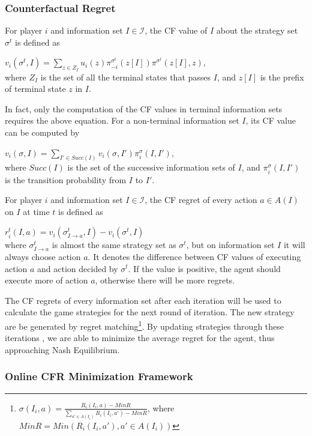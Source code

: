 \documentclass{article}
\begin{document}
\subsubsection{Counterfactual Regret}

For player $i$ and information set $I \in \mathscr{I}$, the CF value of $I$ about the strategy set $\sigma^t$ is defined as

$v_i(\sigma^t, I) = \sum_{z \in Z_I} u_i(z) \pi_{-i}^{\sigma^t}(z[I]) \pi^{\sigma^t}(z[I], z)$,\\
where $Z_I$ is the set of all the terminal states that passes $I$, and $z[I]$ is the prefix of terminal state $z$ in $I$.

In fact, only the computation of the CF values in terminal information sets requires the above equation. For a non-terminal information set $I$, its CF value can be computed by

$v_i(\sigma, I) = \sum_{I' \in Succ(I)} v_i(\sigma, I') \pi_i^\sigma(I, I')$,
\\where $Succ(I)$ is the set of the successive information sets of $I$, and $\pi_i^\sigma(I, I')$ is the transition probability from $I$ to $I'$.

For player $i$ and information set $I \in \mathscr{I}$, the CF regret of every action $a \in A(I)$ on $I$ at time $t$ is defined as

$r_i^t(I, a) = v_i(\sigma_{I \rightarrow a}^t, I) - v_i(\sigma^t, I)$\\
where $\sigma_{I \rightarrow a}^t$ is almost the same strategy set as $\sigma^t$, but on information set $I$ it will always choose action $a$. It denotes the difference between CF values of executing action $a$ and action decided by $\sigma^t$. If the value is positive, the agent should execute more of action $a$, otherwise there will be more regrets.

The CF regrets of every information set after each iteration will be used to calculate the game strategies for the next round of iteration. The new strategy are be generated by regret matching\footnote{$\sigma(I_i,a)=\frac{R_i(I_i,a)-MinR}{\sum_{a'\in A(I_i)}R_i(I_i,a')-MinR}$, where $MinR = Min(R_i(I_i,a'), a'\in A(I_i))$}. By updating strategies through these iterations , we are able to minimize the average regret for the agent, thus approaching Nash Equilibrium.

\subsubsection{Online CFR Minimization Framework}
\end{document}
